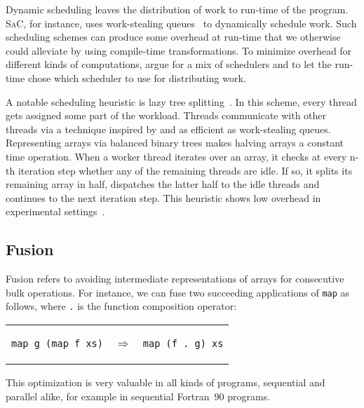 \documentclass[a4paper]{article}
\newcommand{\sac}{S\textsc{a}C}
\begin{document}
Dynamic scheduling leaves the distribution of work to run-time of the
program. \sac{}, for instance, uses work-stealing
queues~\cite{Chase2005Dynamic, Grelck:2007:SOS:1248648.1248654} to
dynamically schedule work. Such scheduling schemes can produce some
overhead at run-time that we otherwise could alleviate by using
compile-time transformations. To minimize overhead for different kinds
of computations, \citet{Fluet:2008:SFG:1411204.1411239} argue for a
mix of schedulers and to let the run-time chose which scheduler to use
for distributing work.

A notable scheduling heuristic is lazy tree
splitting~\cite{Bergstrom:2010:LTS:1863543.1863558}. In this scheme,
every thread gets assigned some part of the workload. Threads
communicate with other threads via a technique inspired by and as
efficient as work-stealing queues. Representing arrays via balanced
binary trees makes halving arrays a constant time operation. When a
worker thread iterates over an array, it checks at every n-th
iteration step whether any of the remaining threads are idle. If so,
it splits its remaining array in half, dispatches the latter half to
the idle threads and continues to the next iteration step. This
heuristic shows low overhead in experimental
settings~\cite{Bergstrom:2010:LTS:1863543.1863558}.

\subsection{Fusion}
\label{sec:fusion}

Fusion refers to avoiding intermediate representations of arrays for
consecutive bulk operations. For instance, we can fuse two succeeding
applications of \texttt{map} as follows, where \texttt{.} is the
function composition operator:

\begin{center}
  \begin{tabular}{ccc}
\begin{lstlisting}[language=ML]
map g (map f xs)
\end{lstlisting}
    & $\Longrightarrow$ &
\begin{lstlisting}[language=ML]
map (f . g) xs
\end{lstlisting}
  \end{tabular}
\end{center}

This optimization is very valuable in all kinds of programs,
sequential and parallel alike, for example in sequential
Fortran~90 programs\cite{Hwang:1995:AOS:209936.209949}.
\end{document}
